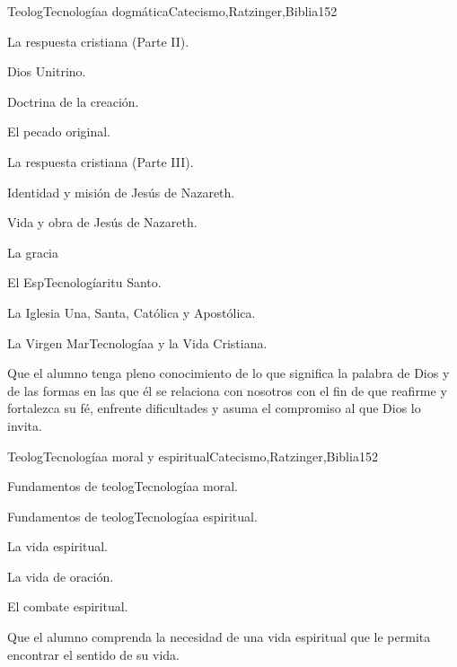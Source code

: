 \begin{syllabus}
\begin{unit}{TeologTecnologíaa dogmática}{Catecismo,Ratzinger,Biblia}{15}{2}
\begin{topics}
	\item La respuesta cristiana (Parte II). 
	      \begin{inparaenum}
		  \item Dios Unitrino.
		  \item Doctrina de la creación.
		  \item El pecado original.
	      \end{inparaenum}
	 \item La respuesta cristiana (Parte III). 
	      \begin{inparaenum}
		  \item Identidad y misión de Jesús de Nazareth.
		  \item Vida y obra de Jesús de Nazareth.
		  \item La gracia
		  \item El EspTecnologíaritu Santo.
		  \item La Iglesia Una, Santa, Católica y Apostólica.
		  \item La Virgen MarTecnologíaa y la Vida Cristiana.
	      \end{inparaenum}
\end{topics}
\begin{learningoutcomes}
	\item Que el alumno tenga pleno conocimiento de lo que significa la palabra de Dios y de las formas en las que él se relaciona con nosotros con el fin de que reafirme y fortalezca su fé, enfrente dificultades y asuma el compromiso al que Dios lo invita.
\end{learningoutcomes}
\end{unit}

\begin{unit}{TeologTecnologíaa moral y espiritual}{Catecismo,Ratzinger,Biblia}{15}{2}
\begin{topics}
      \item Fundamentos de teologTecnologíaa moral.
      \item Fundamentos de teologTecnologíaa espiritual.
      \item La vida espiritual.
      \item La vida de oración.
      \item El combate espiritual.
\end{topics}

\begin{learningoutcomes}
      \item Que el alumno comprenda la necesidad de una vida espiritual que le permita encontrar el sentido de su vida.
\end{learningoutcomes}
\end{unit}



\begin{coursebibliography}
\end{coursebibliography}

\end{syllabus}
